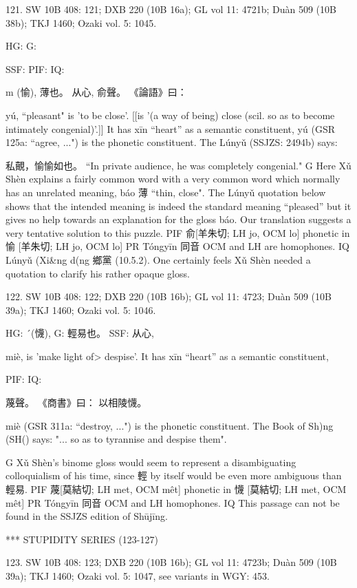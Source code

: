 121. SW 10B 408: 121; DXB 220 (10B 16a); GL vol 11: 4721b; Duàn 509 (10B 38b); TKJ 1460; Ozaki vol. 5: 1045.


HG:
G:

SSF: PIF: IQ:

m (愉),
薄也。
从心,
俞聲。
《論語》曰：


yú, ``pleasant"
is 'to be close'. [[is '(a way of being) close (scil. so as to become intimately congenial)'.]]
It has xīn ``heart'' as a semantic constituent,
yú (GSR 125a: ``agree, ...") is the phonetic constituent. The Lúnyǔ (SSJZS: 2494b) says:

私覿，愉愉如也。 ``In private audience, he was completely congenial."
G    Here Xǔ Shèn explains a fairly common word with a very common word which normally has an unrelated meaning, báo 薄 ``thin, close". The Lúnyǔ quotation below shows that the intended meaning is indeed the standard meaning ``pleased'' but it gives no help towards an explanation for the gloss báo. Our translation suggests a very tentative solution to this puzzle.
PIF     俞[羊朱切; LH jo, OCM lo] phonetic in 愉 [羊朱切; LH jo, OCM lo]
PR	Tóngyīn 同音 OCM and LH are homophones.
IQ	Lúnyǔ (Xi&ng d(ng 鄉黨 (10.5.2).
One certainly feels Xǔ Shèn needed a quotation to clarify his rather opaque gloss.


122. SW 10B 408: 122; DXB 220 (10B 16b); GL vol 11: 4723; Duàn 509 (10B 39a); TKJ 1460; Ozaki vol. 5: 1046.

HG:   ´(懱),
G:	輕易也。
SSF: 从心,


miè,
is 'make light of> despise'.
It has xīn ``heart'' as a semantic constituent,

PIF: IQ:

蔑聲。
《商書》曰： 以相陵懱。

miè (GSR 311a: ``destroy, ...") is the phonetic constituent. The Book of Sh)ng (SH() says:
"... so as to tyrannise and despise them".

G	Xǔ Shèn's binome gloss would seem to represent a disambiguating colloquialism of his time, since 輕 by itself would be even more ambiguous than 輕易.
PIF     蔑[莫結切; LH met, OCM mêt] phonetic in 懱 [莫結切; LH met, OCM mêt]
PR	Tóngyīn 同音 OCM and LH homophones.
IQ	This passage can not be found in the SSJZS edition of Shūjīng.



***
STUPIDITY SERIES (123-127)

123. SW 10B 408: 123; DXB 220 (10B 16b); GL vol 11: 4723b; Duàn 509 (10B 39a); TKJ 1460; Ozaki vol. 5: 1047, see
variants in WGY: 453.

